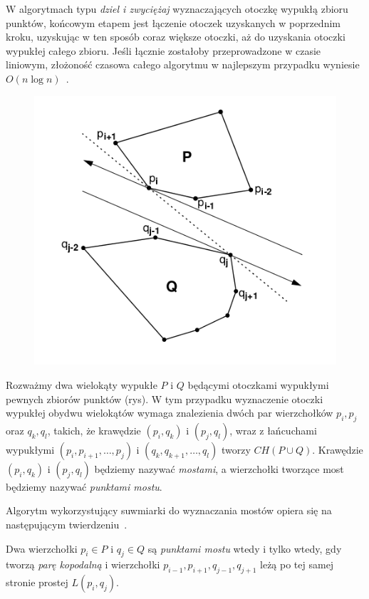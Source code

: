 W algorytmach typu \emph{dziel i zwyciężaj} wyznaczających otoczkę
wypukłą zbioru punktów, końcowym etapem jest łączenie otoczek
uzyskanych w poprzednim kroku, uzyskując w ten sposób coraz większe
otoczki, aż do uzyskania otoczki wypukłej całego zbioru. Jeśli łącznie
zostałoby przeprowadzone w czasie liniowym, złożoność czasowa całego
algorytmu w najlepszym przypadku wyniesie $O(n \log n)$~\cite{Graham72}.

\begin{figure}[htb]
  \centering
  \includegraphics[scale=0.5]{img/calipers4}
  \caption{\label{img:calipers4}}
\end{figure}

Rozważmy dwa wielokąty wypukłe $P$ i $Q$ będącymi otoczkami wypukłymi
pewnych zbiorów punktów (rys). W tym przypadku wyznaczenie otoczki
wypukłej obydwu wielokątów wymaga znalezienia dwóch par wierzchołków
$p_i, p_j$ oraz $q_k, q_l$, takich, że krawędzie $(p_i, q_k)$ i $(p_j,
q_l)$, wraz z łańcuchami wypukłymi $(p_i, p_{i+1}, \ldots, p_j)$ i
$(q_k, q_{k+1}, \ldots, q_l)$ tworzy $CH(P \cup Q)$. Krawędzie $(p_i,
q_k)$ i $(p_j, q_l)$ będziemy nazywać \emph{mostami}, a wierzchołki
tworzące most będziemy nazywać \emph{punktami mostu}.

Algorytm wykorzystujący suwmiarki do wyznaczania mostów opiera się na
następującym twierdzeniu~\cite{Toussaint83}.

\begin{twierdzenie}
\label{thm:bridge}
  Dwa wierzchołki $p_i \in P$ i $q_j \in Q$ są \emph{punktami mostu}
  wtedy i tylko wtedy, gdy tworzą \emph{parę kopodalną} i wierzchołki
  $p_{i-1}, p_{i+1}, q_{j-1}, q_{j+1}$ leżą po tej samej stronie
  prostej $L(p_i, q_j)$.
\end{twierdzenie}


